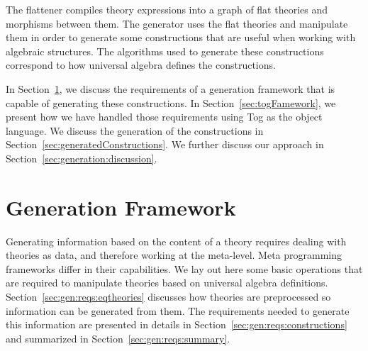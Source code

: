 \label{ch:generation}

The flattener compiles theory expressions into a graph of flat theories and morphisms between them. The generator uses the flat theories and manipulate them in order to generate some constructions that are useful when working with algebraic structures. The algorithms used to generate these constructions correspond to how universal algebra defines the constructions.

In Section~\ref{sec:genFrameReqs}, we discuss the requirements of a generation framework that is capable of generating these constructions. In Section~\ref{sec:togFamework}, we present how we have handled those requirements using Tog as the object language. We discuss the generation of the constructions in Section~\ref{sec:generatedConstructions}. We further discuss our approach in Section~\ref{sec:generation:discussion}. 

\section{Generation Framework}
\label{sec:genFrameReqs}

Generating information based on the content of a theory requires dealing with theories as data, and therefore working at the meta-level. Meta programming frameworks differ in their capabilities. We lay out here some basic operations that are required to manipulate theories based on universal algebra definitions.  Section~\ref{sec:gen:reqs:eqtheories} discusses how theories are preprocessed so information can be generated from them. The requirements needed to generate this information are presented in details in Section~\ref{sec:gen:reqs:constructions} and summarized in Section~\ref{sec:gen:reqs:summary}. 


